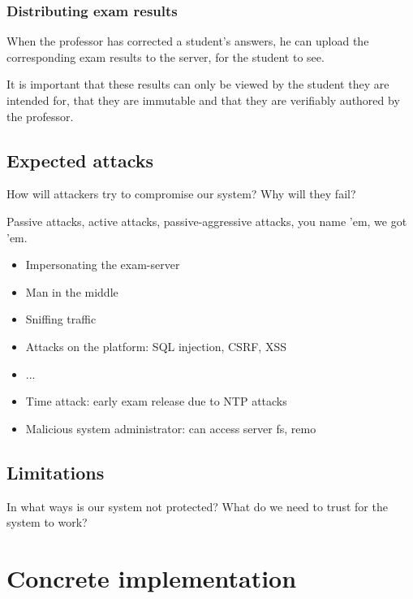 \documentclass[12pt]{article}
\begin{document}
\subsubsection{Distributing exam results}
\label{subsubsec:req-func-results}


When the professor has corrected a student's answers, he can upload the
corresponding exam results to the server, for the student to see.

It is important that these results can only be viewed by the student they are
intended for, that they are immutable and that they are verifiably authored by
the professor.

\subsection{Expected attacks}
\label{subsec:req-attacks}

How will attackers try to compromise our system? Why will they fail?

Passive attacks, active attacks, passive-aggressive attacks, you name 'em, we
got 'em.

\begin{itemize}
\item Impersonating the exam-server
\item Man in the middle
\item Sniffing traffic
\item Attacks on the platform: SQL injection, CSRF, XSS
\item ...
\item Time attack: early exam release due to NTP attacks
\item Malicious system administrator: can access server fs, remo
\end{itemize}

\subsection{Limitations}
\label{subsec:req-limitations}

In what ways is our system not protected? What do we need to trust for the
system to work?

\section{Concrete implementation}
\label{sec:implementation}
\end{document}
